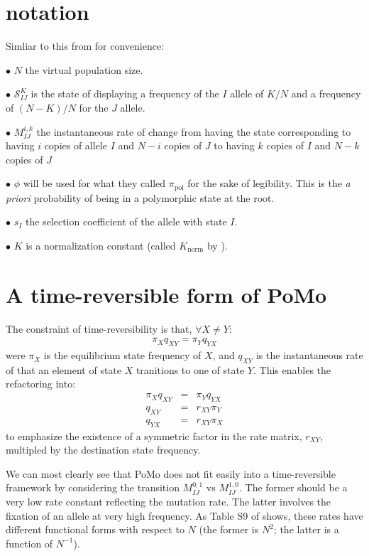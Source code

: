 \documentclass{llncs}
\newcommand{\virtPopSize}{\ensuremath{N}}
\newcommand{\polyProb}{\ensuremath{\phi}}}
\newcommand{\pomoState}[3]{\ensuremath{\mathcal{S}_{#1#2}^{#3}}}}
\newcommand{\Knorm}{\ensuremath{K}}}
\newcommand{\pomo}{PoMo\xspace}
\begin{document}
\section{notation}
Simliar to this from  \cite{DeMaioSK2013} for convenience:
\begin{compactitem}
\item[$\bullet$] $\virtPopSize$ the virtual population size.
\item[$\bullet$] $\pomoState{I}{J}{K}$ is the state of displaying a frequency of the $I$ allele of $K/\virtPopSize$ and a frequency of $(N-K)/N$ for the $J$ allele.
\item[$\bullet$] $M_{IJ}^{i,k}$ the instantaneous rate of change from having the state corresponding to having $i$ copies of allele $I$ and $N-i$ copies of $J$ to having $k$ copies of $I$ and $N-k$ copies of $J$
\item[$\bullet$] $\polyProb$ will be used for what they called $\pi_{\mbox{pol}}$ for the sake of 
    legibility. This is the {\em a priori} probability of being in a polymorphic state at the root.
\item[$\bullet$] $s_I$ the selection coefficient of the allele with state $I$.
\item[$\bullet$] $\Knorm$ is a normalization constant (called $K_{\mbox{norm}}$ by \cite{DeMaioSK2013}).
\end{compactitem}

\section{A time-reversible form of \pomo}
The constraint of time-reversibility is that, $\forall X \neq Y$:
\begin{eqnarray}
    \pi_X q_{XY} = \pi_Y q_{YX}
\end{eqnarray}
were $\pi_X$ is the equilibrium state frequency of $X$, and $q_{XY}$ is the instantaneous
    rate of that an element of state $X$ tranitions to one of state $Y$.
This enables the refactoring into:
\begin{eqnarray}
    \pi_X q_{XY} & = & \pi_Y q_{YX} \\
    q_{XY} & = & r_{XY}\pi_Y \\
    q_{YX} & = & r_{XY}\pi_X
\end{eqnarray}
to emphasize the existence of a symmetric factor in the rate matrix, $r_{XY}$, multipled by the destination state frequency.

We can most clearly see that \pomo does not fit easily into a time-reversible framework by considering 
    the transition $M_{IJ}^{0,1}$ vs $M_{IJ}^{1,0}$. 
The former should be a very low rate constant reflecting the mutation rate.
The latter involves the fixation of an allele at very high frequency.
As Table S9 of  \cite{DeMaioSK2013} shows, these rates have different functional forms with respect to $N$ (the former is $N^2$; the latter is a function of $N^{-1}$).
\end{document}
